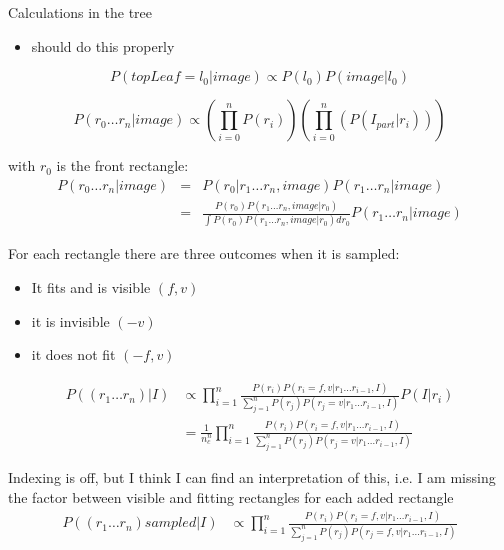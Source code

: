 \documentclass[a4paper]{article}
\begin{document}
Calculations in the tree
\begin{itemize}
\item should do this properly
\end{itemize}
\begin{equation}
P(topLeaf=l_0|image) \propto P(l_0)P(image|l_0)
\end{equation}


\begin{equation}
P(r_0\dots r_n|image) \propto \left(\prod_{i=0}^n P(r_i)\right)\left(\prod_{i=0}^n(P(I_{part}|r_i))\right)
\end{equation}


with $r_0$ is the front rectangle:
\begin{align}
P(r_0\dots r_n|image)& = &P(r_0|r_1\dots r_n,image) P(r_1\dots r_n|image)\\
& = & \frac{P(r_0)P(r_1\dots r_n,image|r_0)}{\int P(r_0)P(r_1\dots r_n,image|r_0) dr_0} P(r_1\dots r_n|image)
\end{align}



For each rectangle there are three outcomes when it is sampled:
\begin{itemize}
\item It fits and is visible  $(f,v)$
\item it is invisible         $(-v)$
\item it does not fit     $(-f,v)$
\end{itemize}

\begin{align}
P((r_1\dots r_n)|I) &\propto \prod_{i=1}^n \frac{P(r_i) P(r_i  = f,v|r_1\dots r_{i-1},I)}{\sum_{j=1}^n P(r_j )P(r_j  = v|r_1\dots r_{i-1},I)} P(I|r_i)\\
 &=  \frac{1}{n_c^n} \prod_{i=1}^n \frac{P(r_i) P(r_i  = f,v|r_1\dots r_{i-1},I)}{\sum_{j=1}^n P(r_j )P(r_j  = v|r_1\dots r_{i-1},I)} 
\end{align}


Indexing is off, but I think I can find an interpretation of this, i.e. I am missing the factor between visible and fitting rectangles for each added rectangle
\begin{align}
P((r_1\dots r_n) sampled|I) &\propto \prod_{i=1}^n \frac{P(r_i) P(r_i  = f,v|r_1\dots r_{i-1},I) }{\sum_{j=1}^n P(r_j )P(r_j  = f,v|r_1\dots r_{i-1},I)} 
\end{align}
\end{document}
